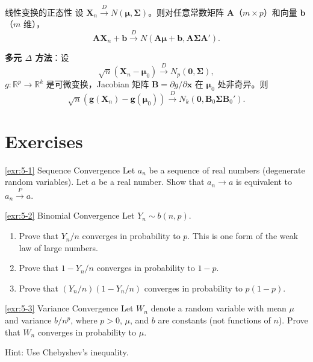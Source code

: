 \begin{example}{线性变换的正态性}\label{th:linear-transformation}
设 $\mathbf{X}_n \xrightarrow{D} N(\boldsymbol{\mu}, \boldsymbol{\Sigma})$。则对任意常数矩阵 $\mathbf{A}$（$m \times p$）和向量 $\mathbf{b}$（$m$ 维），
\[
\mathbf{A}\mathbf{X}_n + \mathbf{b} \xrightarrow{D} N(\mathbf{A}\boldsymbol{\mu} + \mathbf{b}, \mathbf{A}\boldsymbol{\Sigma}\mathbf{A}').
\label{eq:linear-normal}
\]
\end{example}

\textbf{多元 $\Delta$ 方法}：设
\[
\sqrt{n}(\mathbf{X}_n - \boldsymbol{\mu}_0) \xrightarrow{D} N_p(\mathbf{0}, \boldsymbol{\Sigma}),
\]
$g: \mathbb{R}^p \to \mathbb{R}^k$ 是可微变换，Jacobian 矩阵 $\mathbf{B} = \partial g / \partial \mathbf{x}$ 在 $\boldsymbol{\mu}_0$ 处非奇异。则
\[
\sqrt{n}(\mathbf{g}(\mathbf{X}_n) - \mathbf{g}(\boldsymbol{\mu}_0)) \xrightarrow{D} N_k(\mathbf{0}, \mathbf{B}_0\boldsymbol{\Sigma}\mathbf{B}_0').
\label{eq:multivariate-delta-method}
\]

\section*{Exercises}\label{sec:chapter5-exercises}

\begin{exercise}{\ref{exr:5-1} Sequence Convergence}\label{exr:5-1}
Let ${a_n}$ be a sequence of real numbers (degenerate random variables). Let $a$ be a real number. Show that $a_n \to a$ is equivalent to $a_n \xrightarrow{P} a$.
\end{exercise}

\begin{exercise}{\ref{exr:5-2} Binomial Convergence}\label{exr:5-2}
Let $Y_n \sim b(n,p)$.
\begin{enumerate}
\item[(a)] Prove that $Y_n/n$ converges in probability to $p$. This is one form of the weak law of large numbers.
\item[(b)] Prove that $1 - Y_n/n$ converges in probability to $1 - p$.
\item[(c)] Prove that $(Y_n/n)(1 - Y_n/n)$ converges in probability to $p(1-p)$.
\end{enumerate}
\end{exercise}

\begin{exercise}{\ref{exr:5-3} Variance Convergence}\label{exr:5-3}
Let $W_n$ denote a random variable with mean $\mu$ and variance $b/n^p$, where $p > 0$, $\mu$, and $b$ are constants (not functions of $n$). Prove that $W_n$ converges in probability to $\mu$.

Hint: Use Chebyshev's inequality.
\end{exercise}


